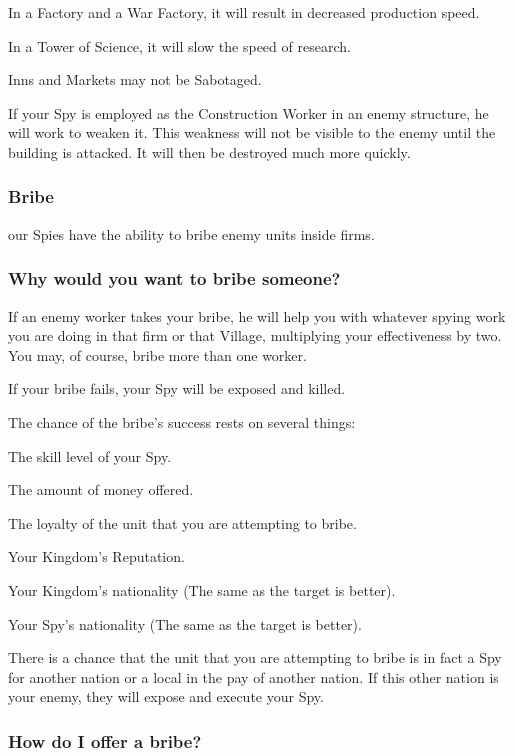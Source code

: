 In a Factory and a War Factory, it will result in decreased production speed.

In a Tower of Science, it will slow the speed of research.

Inns and Markets may not be Sabotaged.

If your Spy is employed as the Construction Worker in an enemy structure, he will work to weaken it. This weakness will not be visible to the enemy until the building is attacked. It will then be destroyed much more quickly.

\subsubsection{Bribe}


our Spies have the ability to bribe enemy units inside firms.

\subsubsection{Why would you want to bribe someone?}

If an enemy worker takes your bribe, he will help you with whatever spying work you are doing in that firm or that Village, multiplying your effectiveness by two. You may, of course, bribe more than one worker.

If your bribe fails, your Spy will be exposed and killed.

The chance of the bribe’s success rests on several things:

\begin{changemargin}{.5cm}{0cm}
The skill level of your Spy.

The amount of money offered.

The loyalty of the unit that you are attempting to bribe.

Your Kingdom’s Reputation.

Your Kingdom’s nationality (The same as the target is better).

Your Spy’s nationality (The same as the target is better).
\end{changemargin}

There is a chance that the unit that you are attempting to bribe is in fact a Spy for another nation or a local in the pay of another nation. If this other nation is your enemy, they will expose and execute your Spy.

\subsubsection{How do I offer a bribe?}

